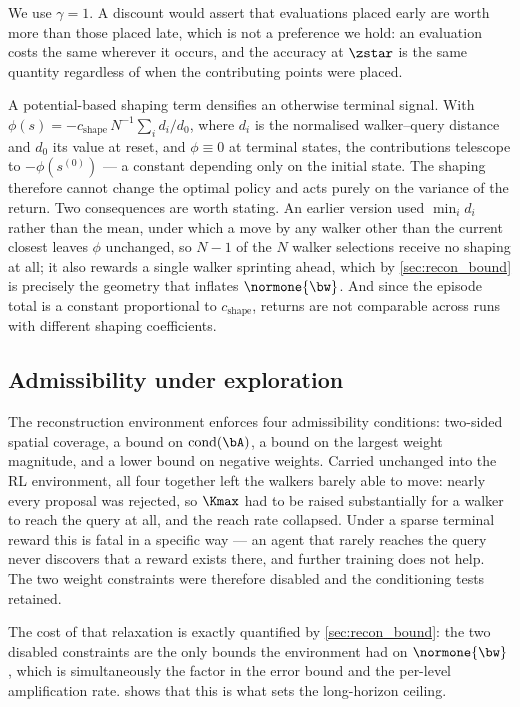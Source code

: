 We use $\gamma = 1$. A discount would assert that evaluations placed early
are worth more than those placed late, which is not a preference we hold: an
evaluation costs the same wherever it occurs, and the accuracy at $\zstar$ is
the same quantity regardless of when the contributing points were placed.

A potential-based shaping term densifies an otherwise terminal signal. With
$\phi(s) = -c_{\mathrm{shape}}\, N^{-1} \sum_i d_i / d_0$, where $d_i$ is the
normalised walker--query distance and $d_0$ its value at reset, and
$\phi \equiv 0$ at terminal states, the contributions telescope to
$-\phi(s^{(0)})$ --- a constant depending only on the initial state. The
shaping therefore cannot change the optimal policy  and
acts purely on the variance of the return. Two consequences are worth
stating. An earlier version used $\min_i d_i$ rather than the mean, under
which a move by any walker other than the current closest leaves $\phi$
unchanged, so $N-1$ of the $N$ walker selections receive no shaping at all;
it also rewards a single walker sprinting ahead, which by
\cref{sec:recon_bound} is precisely the geometry that inflates
$\normone{\bw}$. And since the episode total is a constant proportional to
$c_{\mathrm{shape}}$, returns are not comparable across runs with different
shaping coefficients.

\subsection{Admissibility under exploration}
\label{sec:mdp_admiss}

The reconstruction environment enforces four admissibility conditions:
two-sided spatial coverage, a bound on $\mathrm{cond}(\bA)$, a bound on the
largest weight magnitude, and a lower bound on negative weights. Carried
unchanged into the RL environment, all four together left the walkers barely
able to move: nearly every proposal was rejected, so $\Kmax$ had to be raised
substantially for a walker to reach the query at all, and the reach rate
collapsed. Under a sparse terminal reward this is fatal in a specific way ---
an agent that rarely reaches the query never discovers that a reward exists
there, and further training does not help. The two weight constraints were
therefore disabled and the conditioning tests retained.

The cost of that relaxation is exactly quantified by \cref{sec:recon_bound}:
the two disabled constraints are the only bounds the environment had on
$\normone{\bw}$, which is simultaneously the factor in the error bound and
the per-level amplification rate.  shows that this is what
sets the long-horizon ceiling.

